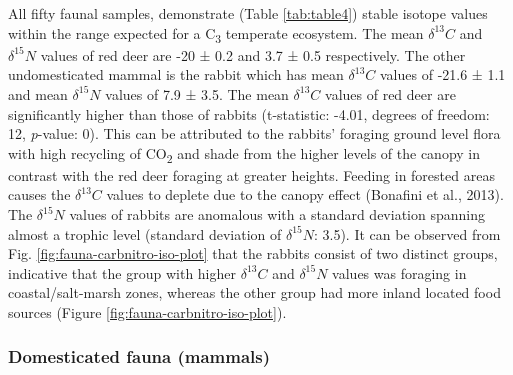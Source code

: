 \documentclass[review]{elsarticle} %
\begin{document}
All fifty faunal samples, demonstrate (Table \ref{tab:table4}) stable isotope values within the range expected for a C\textsubscript{3} temperate ecosystem. The mean \(\delta ^{13}C\) and \(\delta ^{15}N\) values of red deer are -20 ± 0.2\text{\textperthousand} and 3.7 ± 0.5\text{\textperthousand} respectively. The other undomesticated mammal is the rabbit which has mean \(\delta ^{13}C\) values of -21.6 ± 1.1\text{\textperthousand} and mean \(\delta ^{15}N\) values of 7.9 ± 3.5\text{\textperthousand}. The mean \(\delta ^{13}C\) values of red deer are significantly higher than those of rabbits (t-statistic: -4.01, degrees of freedom: 12, \emph{p}-value: 0). This can be attributed to the rabbits' foraging ground level flora with high recycling of CO\textsubscript{2} and shade from the higher levels of the canopy in contrast with the red deer foraging at greater heights. Feeding in forested areas causes the \(\delta ^{13}C\) values to deplete due to the canopy effect (Bonafini et al., 2013). The \(\delta ^{15}N\) values of rabbits are anomalous with a standard deviation spanning almost a trophic level (standard deviation of \(\delta ^{15}N\): 3.5\text{\textperthousand}). It can be observed from Fig. \ref{fig:fauna-carbnitro-iso-plot} that the rabbits consist of two distinct groups, indicative that the group with higher \(\delta ^{13}C\) and \(\delta ^{15}N\) values was foraging in coastal/salt-marsh zones, whereas the other group had more inland located food sources (Figure \ref{fig:fauna-carbnitro-iso-plot}).

\hypertarget{domesticated-fauna-mammals}{%
\subsubsection{Domesticated fauna (mammals)}\label{domesticated-fauna-mammals}}
\end{document}
